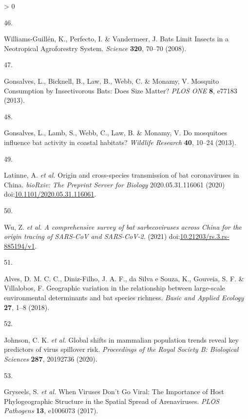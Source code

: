\documentclass[10pt,oneside]{article}
\newlength{\cslhangindent}
\newlength{\csllabelwidth}
\newenvironment{CSLReferences}[3] %
 {%
  \setlength{\parindent}{0pt}
  \ifodd #1 \everypar{\setlength{\hangindent}{\cslhangindent}}\ignorespaces\fi
  \ifnum #2 > 0
  \setlength{\parskip}{#2\baselineskip}
  \fi
 }%
 {}
\newcommand{\CSLLeftMargin}[1]{\parbox[t]{\maxof{\widthof{#1}}{\csllabelwidth}}{#1}}
\newcommand{\CSLRightInline}[1]{\parbox[t]{\linewidth}{#1}}
\begin{document}
\begin{CSLReferences}{0}{0}
\leavevmode\hypertarget{ref-Williams-Guillen2008BatLim}{}%
\CSLLeftMargin{46. }
\CSLRightInline{Williams-Guillén, K., Perfecto, I. \& Vandermeer, J.
Bats Limit Insects in a Neotropical Agroforestry System. \emph{Science}
\textbf{320}, 70--70 (2008).}

\leavevmode\hypertarget{ref-Gonsalves2013MosCon}{}%
\CSLLeftMargin{47. }
\CSLRightInline{Gonsalves, L., Bicknell, B., Law, B., Webb, C. \&
Monamy, V. Mosquito Consumption by Insectivorous Bats: Does Size Matter?
\emph{PLOS ONE} \textbf{8}, e77183 (2013).}

\leavevmode\hypertarget{ref-Gonsalves2013MosInf}{}%
\CSLLeftMargin{48. }
\CSLRightInline{Gonsalves, L., Lamb, S., Webb, C., Law, B. \& Monamy, V.
Do mosquitoes influence bat activity in coastal habitats? \emph{Wildlife
Research} \textbf{40}, 10--24 (2013).}

\leavevmode\hypertarget{ref-Latinne2020OriCro}{}%
\CSLLeftMargin{49. }
\CSLRightInline{Latinne, A. \emph{et al.} Origin and cross-species
transmission of bat coronaviruses in China. \emph{bioRxiv: The Preprint
Server for Biology} 2020.05.31.116061 (2020)
doi:\href{https://doi.org/10.1101/2020.05.31.116061}{10.1101/2020.05.31.116061}.}

\leavevmode\hypertarget{ref-Wu2021ComSur}{}%
\CSLLeftMargin{50. }
\CSLRightInline{Wu, Z. \emph{et al.} \emph{A comprehensive survey of bat
sarbecoviruses across China for the origin tracing of SARS-CoV and
SARS-CoV-2}. (2021)
doi:\href{https://doi.org/10.21203/rs.3.rs-885194/v1}{10.21203/rs.3.rs-885194/v1}.}

\leavevmode\hypertarget{ref-Alves2018GeoVar}{}%
\CSLLeftMargin{51. }
\CSLRightInline{Alves, D. M. C. C., Diniz-Filho, J. A. F., da Silva e
Souza, K., Gouveia, S. F. \& Villalobos, F. Geographic variation in the
relationship between large-scale environmental determinants and bat
species richness. \emph{Basic and Applied Ecology} \textbf{27}, 1--8
(2018).}

\leavevmode\hypertarget{ref-Johnson2020GloShi}{}%
\CSLLeftMargin{52. }
\CSLRightInline{Johnson, C. K. \emph{et al.} Global shifts in mammalian
population trends reveal key predictors of virus spillover risk.
\emph{Proceedings of the Royal Society B: Biological Sciences}
\textbf{287}, 20192736 (2020).}

\leavevmode\hypertarget{ref-Gryseels2017WheVir}{}%
\CSLLeftMargin{53. }
\CSLRightInline{Gryseels, S. \emph{et al.} When Viruses Don't Go Viral:
The Importance of Host Phylogeographic Structure in the Spatial Spread
of Arenaviruses. \emph{PLOS Pathogens} \textbf{13}, e1006073 (2017).}


\end{CSLReferences}
\end{document}
